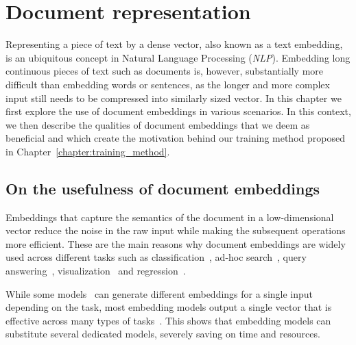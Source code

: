 \chapter{Document representation}\label{chapter:document_representation}

Representing a piece of text by a dense vector, also known as a text embedding,
is an ubiquitous concept in Natural Language Processing (\emph{NLP}). Embedding
long continuous pieces of text such as documents is, however, substantially
more difficult than embedding words or sentences, as the longer and more
complex input still needs to be compressed into similarly sized vector. In this
chapter we first explore the use of document embeddings in various scenarios.
In this context, we then describe the qualities of document embeddings that we
deem as beneficial and which create the motivation behind our training method
proposed in Chapter~\ref{chapter:training_method}.

\section{On the usefulness of document embeddings}



Embeddings that capture the semantics of the document in a low-dimensional
vector reduce the noise in the raw input while making the subsequent operations
more efficient.
These are the main reasons why document embeddings are
widely used across different tasks such as
classification~\citep{cohan2020specter, neelakantan2022text,
izacard2021unsupervised, ostendorff2022neighborhood}, ad-hoc
search~\citep{singh2022scirepeval, zamani2018neural}, query
answering~\citep{neelakantan2022text}, visualization~\citep{cohan2020specter,
dai2015document} and regression~\citep{singh2022scirepeval}.

While some models~\citep{singh2022scirepeval} can generate different embeddings
for a single input depending on the task, most embedding models output a single
vector that is effective across many types of tasks~\citep{neelakantan2022text,
cohan2020specter, ostendorff2022neighborhood}. This shows that embedding models
can substitute several dedicated models, severely saving on time and resources.


